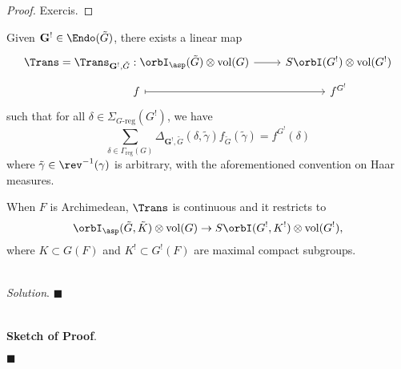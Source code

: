 \documentclass[11pt, a3paper, openany]{article}
\newcommand{\mes}{\operatorname{vol}}
\theoremstyle{remark}
\theoremstyle{remark}
\theoremstyle{remark}
\newenvironment{Proof of claim}
  {\begin{proof}[\normalfont \textbf{Proof of claim}]}
  {\end{proof}}
\newenvironment{Soln}{\vspace{4pt}\textbf{\\}{\color{red}\textit{Solution}}.\normalfont}{\color{red}\hfill$\blacksquare$\vspace{4pt}\par}	%
\newenvironment{skPf}{\vspace{1ex}\textbf{\\}{\color{black}\textbf{Sketch of Proof}}.\normalfont}{\color{black}\hfill$\blacksquare$\vspace{1ex}\par}
\theoremstyle{definition}
\theoremstyle{remark}
\theoremstyle{plain}
\begin{document}
\begin{proof}
    Exercis.
\end{proof}
\begin{theorem}{}{}
	Given $\mathbf{G}^! \in \Endo(\tilde{G})$, there exists a linear map
	\[\begin{tikzcd}[row sep=tiny]
		\Trans = \Trans_{\mathbf{G}^!, \tilde{G}}: \orbI_{\asp}(\tilde{G}) \otimes \mes(G) \arrow[r] & S\orbI(G^!) \otimes \mes(G^!)\\
		f \arrow[mapsto, r]& f^{G^!}
	\end{tikzcd}\]
	such that for all $\delta \in \Sigma_{G\text{-reg}}(G^!)$, we have
	\[ \sum_{\delta \in \Gamma_{\mathrm{reg}}(G)} \Delta_{\mathbf{G}^!, \tilde{G}}(\delta, \tilde{\gamma}) f_{\tilde{G}}(\tilde{\gamma}) = f^{G^!}(\delta) \]
	where $\tilde{\gamma} \in \rev^{-1}(\gamma)$ is arbitrary, with the aforementioned convention on Haar measures.
	
	When $F$ is Archimedean, $\Trans$ is continuous and it restricts to
	\[ \orbI_{\asp}(\tilde{G}, \tilde{K}) \otimes \mes(G) \to S\orbI(G^!, K^!) \otimes \mes(G^!), \]
	where $K \subset G(F)$ and $K^! \subset G^!(F)$ are maximal compact subgroups.
\end{theorem}
\begin{Soln}
\end{Soln}
\begin{skPf}
    
\end{skPf}
\end{document}
